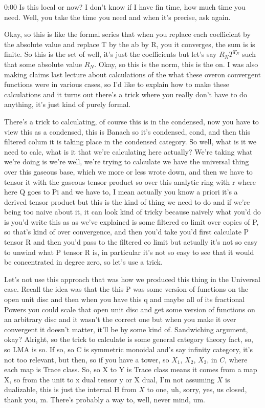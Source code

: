 \begin{unfinished}{0:00}
Is this local or now? I don't know if I have fin time, how much time you need. Well, you take the time you need and when it's precise, ask again.

Okay, so this is like the formal series that when you replace each coefficient by the absolute value and replace T by the ab by R, you it converges, the sum is is finite. So this is the set of well, it's just the coefficients but let's say $R_N T^{T_N}$ such that some absolute value $R_N$. Okay, so this is the norm, this is the on. I was also making claims last lecture about calculations of the what these overon convergent functions were in various cases, so I'd like to explain how to make these calculations and it turns out there's a trick where you really don't have to do anything, it's just kind of purely formal.

There's a trick to calculating, of course this is in the condensed, now you have to view this as a condensed, this is Banach so it's condensed, cond, and then this filtered colum it is taking place in the condensed category. So well, what is it we need to calc, what is it that we're calculating here actually? We're taking what we're doing is we're well, we're trying to calculate we have the universal thing over this gaseous base, which we more or less wrote down, and then we have to tensor it with the gaseous tensor product so over this analytic ring with r where here Q goes to Pi and we have to, I mean actually you know a priori it's a derived tensor product but this is the kind of thing we need to do and if we're being too naive about it, it can look kind of tricky because naively what you'd do is you'd write this as as we've explained is some filtered co limit over copies of P, so that's kind of over convergence, and then you'd take you'd first calculate P tensor R and then you'd pass to the filtered co limit but actually it's not so easy to unwind what P tensor R is, in particular it's not so easy to see that it would be concentrated in degree zero, so let's use a trick.

Let's not use this approach that was how we produced this thing in the Universal case. Recall the idea was that the this P was some version of functions on the open unit disc and then when you have this q and maybe all of its fractional Powers you could scale that open unit disc and get some version of functions on an arbitrary disc and it wasn't the correct one but when you make it over convergent it doesn't matter, it'll be by some kind of.
Sandwiching argument, okay? Alright, so the trick to calculate is some general category theory fact, so, so LMA is so. If so, so C is symmetric monoidal and's say infinity category, it's not too relevant, but then, so if you have a tower, so $X_1$, $X_2$, $X_3$, in $C$, where each map is Trace class. So, so X to Y is Trace class means it comes from a map X, so from the unit to x dual tensor y or X dual, I'm not assuming $X$ is dualizable, this is just the internal H from $X$ to one, uh, sorry, yes, us closed, thank you, m. There's probably a way to, well, never mind, um.


\end{unfinished}
